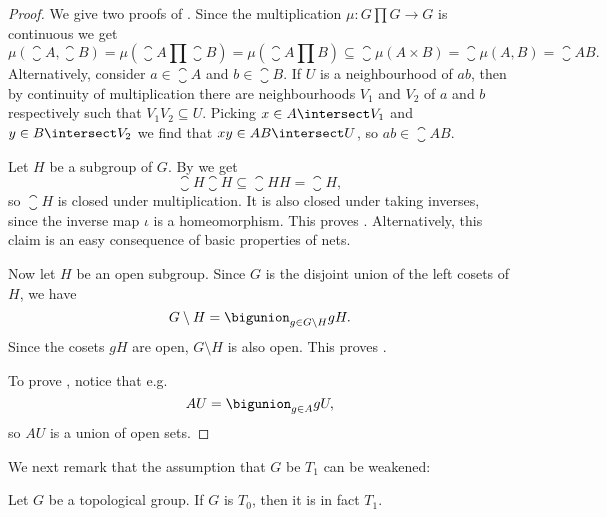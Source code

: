 \documentclass[article, a4paper, 11pt, oneside]{memoir}
\numberwithin{equation}{chapter}
\begin{document}
\begin{proof}
    We give two proofs of . Since the multiplication $\mu \colon G \prod G \to G$ is continuous we get
    \begin{equation*}
        \mu(\closure{A}, \closure{B})
            = \mu(\closure{A} \prod \closure{B})
            = \mu(\closure{A \prod B})
            \subseteq \closure{\mu(A \times B)}
            = \closure{\mu(A, B)}
            = \closure{AB}.
    \end{equation*}
    Alternatively, consider $a \in \closure{A}$ and $b \in \closure{B}$. If $U$ is a neighbourhood of $ab$, then by continuity of multiplication there are neighbourhoods $V_1$ and $V_2$ of $a$ and $b$ respectively such that $V_1 V_2 \subseteq U$. Picking $x \in A \intersect V_1$ and $y \in B \intersect V_2$ we find that $xy \in AB \intersect U$, so $ab \in \closure{AB}$.

    Let $H$ be a subgroup of $G$. By  we get
    \begin{equation*}
        \closure{H} \closure{H} \subseteq \closure{HH} = \closure{H},
    \end{equation*}
    so $\closure{H}$ is closed under multiplication. It is also closed under taking inverses, since the inverse map $\iota$ is a homeomorphism. This proves . Alternatively, this claim is an easy consequence of basic properties of nets.

    Now let $H$ be an open subgroup. Since $G$ is the disjoint union of the left cosets of $H$, we have
    \begin{equation*}
        G \setminus H
            = \bigunion_{g \in G \setminus H} gH.
    \end{equation*}
    Since the cosets $gH$ are open, $G \setminus H$ is also open. This proves .

    To prove , notice that e.g.
    \begin{equation*}
        AU = \bigunion_{g \in A} gU,
    \end{equation*}
    so $AU$ is a union of open sets.
\end{proof}

We next remark that the assumption that $G$ be $T_1$ can be weakened:

\begin{proposition}[$T_0$ implies $T_1$]
    \label{thm:T0_implies_T1}
    Let $G$ be a topological group. If $G$ is $T_0$, then it is in fact $T_1$.
\end{proposition}
\end{document}
